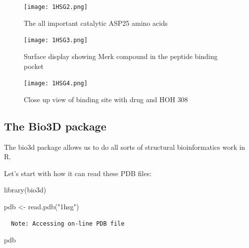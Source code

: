 \documentclass[
  letterpaper,
  DIV=11,
  numbers=noendperiod]{scrartcl}
\newenvironment{Shaded}{\begin{snugshade}}{\end{snugshade}}
\newcommand{\FunctionTok}[1]{\textcolor[rgb]{0.28,0.35,0.67}{#1}}
\newcommand{\NormalTok}[1]{\textcolor[rgb]{0.00,0.23,0.31}{#1}}
\newcommand{\OtherTok}[1]{\textcolor[rgb]{0.00,0.23,0.31}{#1}}
\newcommand{\StringTok}[1]{\textcolor[rgb]{0.13,0.47,0.30}{#1}}
\begin{document}
\begin{figure}[H]

{\centering \texttt{[image: 1HSG2.png]}

}

\caption{The all important catalytic ASP25 amino acids}

\end{figure}%
\begin{figure}[H]

{\centering \texttt{[image: 1HSG3.png]}

}

\caption{Surface display showing Merk compound in the peptide binding
pocket}

\end{figure}%
\begin{figure}[H]

{\centering \texttt{[image: 1HSG4.png]}

}

\caption{Close up view of binding site with drug and HOH 308}

\end{figure}%

\subsection{The Bio3D package}\label{the-bio3d-package}

The bio3d package allows us to do all sorts of structural bioinformatics
work in R.

Let's start with how it can read these PDB files:

\begin{Shaded}
\begin{Highlighting}[]
\FunctionTok{library}\NormalTok{(bio3d)}

\NormalTok{pdb }\OtherTok{\textless{}{-}} \FunctionTok{read.pdb}\NormalTok{(}\StringTok{"1hsg"}\NormalTok{)}
\end{Highlighting}
\end{Shaded}

\begin{verbatim}
  Note: Accessing on-line PDB file
\end{verbatim}

\begin{Shaded}
\begin{Highlighting}[]
\NormalTok{pdb}
\end{Highlighting}
\end{Shaded}
\end{document}

